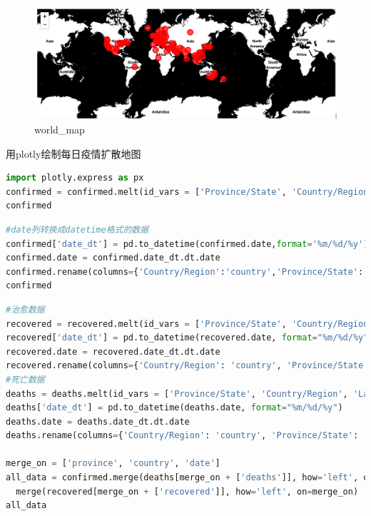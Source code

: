 \documentclass[UTF8,a4paper,12pt]{ctexart}  %
\begin{document}
\begin{figure}
\centering
\includegraphics{./world_map.png}
\caption{world\_map}
\end{figure}

用plotly绘制每日疫情扩散地图

\begin{lstlisting}[language=Python]
import plotly.express as px
confirmed = confirmed.melt(id_vars = ['Province/State', 'Country/Region', 'Lat', 'Long'], var_name='date',value_name = 'confirmed')
confirmed
\end{lstlisting}

\begin{lstlisting}[language=Python]
#date列转换成datetime格式的数据
confirmed['date_dt'] = pd.to_datetime(confirmed.date,format='%m/%d/%y')
confirmed.date = confirmed.date_dt.dt.date
confirmed.rename(columns={'Country/Region':'country','Province/State':'province'},inplace=True)
confirmed
\end{lstlisting}

\begin{lstlisting}[language=Python]
#治愈数据
recovered = recovered.melt(id_vars = ['Province/State', 'Country/Region', 'Lat', 'Long'], var_name='date',value_name = 'recovered')
recovered['date_dt'] = pd.to_datetime(recovered.date, format="%m/%d/%y")
recovered.date = recovered.date_dt.dt.date
recovered.rename(columns={'Country/Region': 'country', 'Province/State': 'province'}, inplace=True)
#死亡数据
deaths = deaths.melt(id_vars = ['Province/State', 'Country/Region', 'Lat', 'Long'], var_name='date', value_name = 'deaths')
deaths['date_dt'] = pd.to_datetime(deaths.date, format="%m/%d/%y")
deaths.date = deaths.date_dt.dt.date
deaths.rename(columns={'Country/Region': 'country', 'Province/State': 'province'}, inplace=True)

merge_on = ['province', 'country', 'date']
all_data = confirmed.merge(deaths[merge_on + ['deaths']], how='left', on=merge_on).\
  merge(recovered[merge_on + ['recovered']], how='left', on=merge_on)
all_data
\end{lstlisting}
\end{document}
